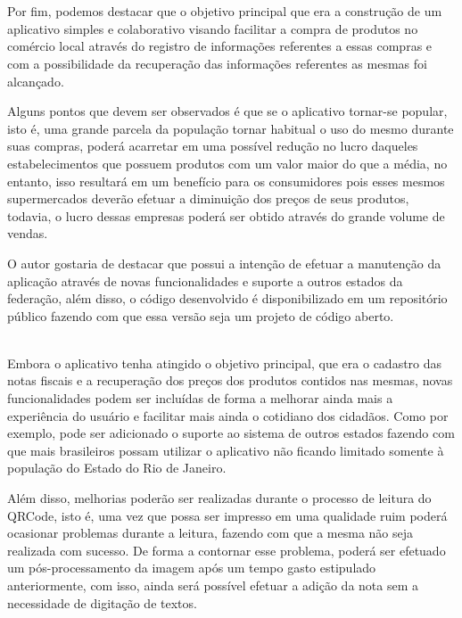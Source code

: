 \chapter*{}
\noindent
{}
\newline
\newline

Por fim, podemos destacar que o objetivo principal que era a construção de um aplicativo simples e colaborativo visando facilitar a compra de produtos no comércio local através do registro de informações referentes a essas compras e com a possibilidade da recuperação das informações referentes as mesmas foi alcançado.

Alguns pontos que devem ser observados é que se o aplicativo tornar-se popular, isto é, uma grande parcela da população tornar habitual o uso do mesmo durante suas compras, poderá acarretar em uma possível redução no lucro daqueles estabelecimentos que possuem produtos com um valor maior do que a média, no entanto, isso resultará em um benefício para os consumidores pois esses mesmos supermercados deverão efetuar a diminuição dos preços de seus produtos, todavia, o lucro dessas empresas poderá ser obtido através do grande volume de vendas.

O autor gostaria de destacar que possui a intenção de efetuar a manutenção da aplicação através de novas funcionalidades e suporte a outros estados da federação, além disso, o código desenvolvido é disponibilizado em um repositório público fazendo com que essa versão seja um projeto de código aberto.\\

\noindent
{}
\\

Embora o aplicativo tenha atingido o objetivo principal, que era o cadastro das notas fiscais e a recuperação dos preços dos produtos contidos nas mesmas, novas funcionalidades podem ser incluídas de forma a melhorar ainda mais a experiência do usuário e facilitar mais ainda o cotidiano dos cidadãos. Como por exemplo, pode ser adicionado o suporte ao sistema de outros estados fazendo com que mais brasileiros possam utilizar o aplicativo não ficando limitado somente à população do Estado do Rio de Janeiro.

Além disso, melhorias poderão ser realizadas durante o processo de leitura do QRCode, isto é, uma vez que possa ser impresso em uma qualidade ruim poderá ocasionar problemas durante a leitura, fazendo com que a mesma não seja realizada com sucesso. De forma a contornar esse problema, poderá ser efetuado um pós-processamento da imagem após um tempo gasto estipulado anteriormente, com isso, ainda será possível efetuar a adição da nota sem a necessidade de digitação de textos.

